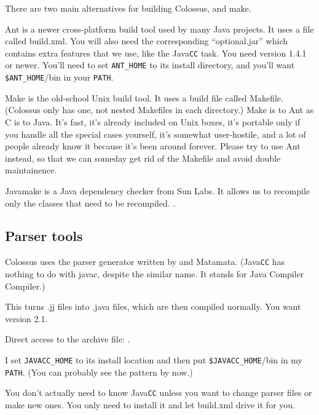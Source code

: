 \documentclass{article}
\begin{document}
There are two main alternatives for building Colossus,
 and make.

Ant is a newer cross-platform build tool used by many Java projects. 
It uses a file called build.xml. You will also need the corresponding
``optional.jar'' which contains extra features that we use, like the 
Java\texttt{CC} task. You need version 1.4.1 or newer. You'll need to set 
\texttt{ANT\_HOME} to its install directory, and you'll want
\texttt{\$ANT\_HOME}/bin in your \texttt{PATH}.

Make is the old-school Unix build tool. It uses a build file called
Makefile. (Colossus only has one, not nested Makefiles in each
directory.) Make is to Ant as C is to Java. It's fast, it's already
included on Unix boxes, it's portable only if you handle all the special
cases yourself, it's somewhat user-hostile, and a lot of people already 
know it because it's been around forever. Please try to use Ant instead, 
so that we can someday get rid of the Makefile and avoid double 
maintainence.

Javamake is a Java dependency checker from Sun Labs.  It allows us to
recompile only the classes that need to be recompiled.
.


\subsection{Parser tools}

Colossus uses the  parser generator
written by  and Matamata.
(Java\texttt{CC} has nothing to do with javac, despite the similar name.
It stands for Java Compiler Compiler.)

This turns .jj files into .java files, which are then compiled normally. 
You want version 2.1.

Direct access to the archive file:
.

I set \texttt{JAVACC\_HOME} to its install location and then put
\texttt{\$JAVACC\_HOME}/bin in my \texttt{PATH}. (You can probably
see the pattern by now.)

You don't actually need to know Java\texttt{CC} unless you want to change
parser files or make new ones. You only need to install it and let build.xml
drive it for you.
\end{document}
